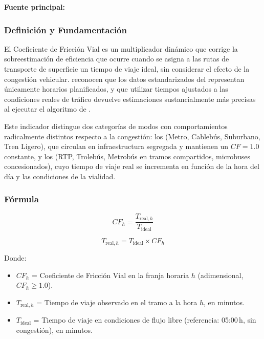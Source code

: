\textbf{Fuente principal:} \textcite{fortin2016innovative}

\subsubsection{Definición y Fundamentación}

El Coeficiente de Fricción Vial es un multiplicador dinámico que corrige la
sobreestimación de eficiencia que ocurre cuando se asigna a las rutas de transporte
de superficie un tiempo de viaje ideal, sin considerar el efecto de la congestión
vehicular. \textcite{fortin2016innovative} reconocen que los datos estandarizados del \gtfs{}
representan únicamente horarios planificados, y que utilizar tiempos ajustados a las
condiciones reales de tráfico devuelve estimaciones sustancialmente más precisas al
ejecutar el algoritmo de \dijkstra{}.

Este indicador distingue dos categorías de modos con comportamientos radicalmente
distintos respecto a la congestión: los  (Metro, Cablebús,
Suburbano, Tren Ligero), que circulan en infraestructura segregada y mantienen un
$CF = 1.0$ constante, y los  (RTP, Trolebús,
Metrobús en tramos compartidos, microbuses concesionados), cuyo tiempo de viaje
real se incrementa en función de la hora del día y las condiciones de la vialidad.

\subsubsection{Fórmula}

\begin{equation}
    CF_h = \frac{T_{\text{real},h}}{T_{\text{ideal}}}
    \label{eq:friccion-vial}
\end{equation}

\begin{equation}
    T_{\text{real},h} = T_{\text{ideal}} \times CF_h
    \label{eq:tiempo-real}
\end{equation}

Donde:
\begin{itemize}
    \item $CF_h$ = Coeficiente de Fricción Vial en la franja horaria $h$
    (adimensional, $CF_h \geq 1.0$).
    \item $T_{\text{real},h}$ = Tiempo de viaje observado en el tramo a la hora $h$,
    en minutos.
    \item $T_{\text{ideal}}$ = Tiempo de viaje en condiciones de flujo libre
    (referencia: 05:00\,h, sin congestión), en minutos.
\end{itemize}

